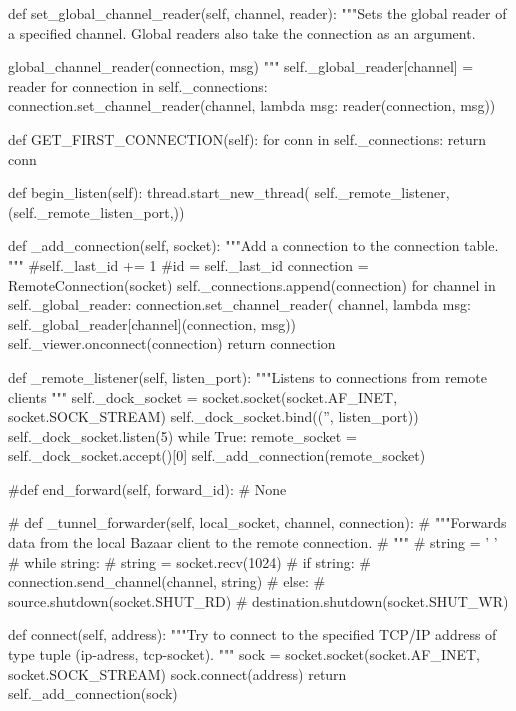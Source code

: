     def set_global_channel_reader(self, channel, reader):
        """Sets the global reader of a specified channel. Global readers
        also take the connection as an argument.

        global_channel_reader(connection, msg)
        """
        self._global_reader[channel] = reader
        for connection in self._connections:
            connection.set_channel_reader(channel, lambda msg:
                                              reader(connection, msg))

    def GET_FIRST_CONNECTION(self):
        for conn in self._connections:
            return conn

    def begin_listen(self):
        thread.start_new_thread(
            self._remote_listener, (self._remote_listen_port,))

    def _add_connection(self, socket):
        """Add a connection to the connection table.
        """
        #self._last_id += 1
        #id = self._last_id
        connection = RemoteConnection(socket)
        self._connections.append(connection)
        for channel in self._global_reader:
            connection.set_channel_reader(
                channel, lambda msg:
                    self._global_reader[channel](connection, msg))
        self._viewer.onconnect(connection)
        return connection

    def _remote_listener(self, listen_port):
        """Listens to connections from remote clients
        """
        self._dock_socket = socket.socket(socket.AF_INET, socket.SOCK_STREAM)
        self._dock_socket.bind(('', listen_port))
        self._dock_socket.listen(5)
        while True:
            remote_socket = self._dock_socket.accept()[0]
            self._add_connection(remote_socket)



    #def end_forward(self, forward_id):
    #    None
                
#     def _tunnel_forwarder(self, local_socket, channel, connection):
#         """Forwards data from the local Bazaar client to the remote connection.
#         """
#         string = ' '
#         while string:
#             string = socket.recv(1024)
#             if string:
#                 connection.send_channel(channel, string)
#             else:
#                 source.shutdown(socket.SHUT_RD)
#                 destination.shutdown(socket.SHUT_WR)

    def connect(self, address):
        """Try to connect to the specified TCP/IP address of type tuple
        (ip-adress, tcp-socket).
        """
        sock = socket.socket(socket.AF_INET, socket.SOCK_STREAM)
        sock.connect(address)
        return self._add_connection(sock)

